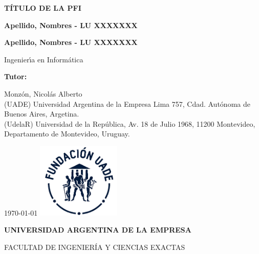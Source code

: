 \begin{titlepage} %

	\centering
	{\textbf{\fontsize{16}{17}\selectfont TÍTULO DE LA PFI} \par}
	\vspace{1cm}
	{\textbf{\fontsize{16}{17}\selectfont Apellido, Nombres - LU XXXXXXX} \par}
	{\textbf{\fontsize{16}{17}\selectfont Apellido, Nombres - LU XXXXXXX} \par}
	\vspace{1.5cm}
	{\fontsize{16}{17}\selectfont Ingenier\'{\i}a en Inform\'atica \par}
	\vspace{1cm}
	{\textbf{\fontsize{14}{14}\selectfont Tutor:} \par}
	{\fontsize{14}{14}\selectfont Monzón, Nicolás Alberto
		\\ (UADE) Universidad Argentina de la Empresa Lima 757, Cdad. Autónoma de Buenos Aires, Argetina.
		\\ (UdelaR) Universidad de la República, Av. 18 de Julio 1968, 11200 Montevideo, Departamento de Montevideo, Uruguay.
		\par}
	\vspace{1cm}
	\vfill
	\today
	\vfill
	\includegraphics[width=0.30\textwidth]{./images/UADE}\par \vspace{1cm}
	{\textbf{\fontsize{14}{14}\selectfont UNIVERSIDAD ARGENTINA DE LA EMPRESA} \par}
	{\fontsize{14}{14}\selectfont FACULTAD DE INGENIER\'IA Y CIENCIAS EXACTAS \par}

\end{titlepage}